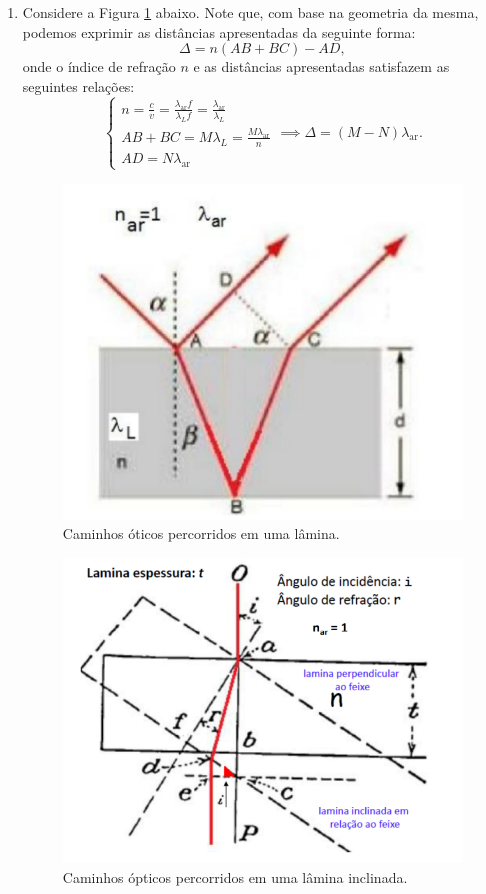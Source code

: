 \documentclass[12pt,a4paper]{article}
\begin{document}
\begin{enumerate}[label = \alph*)]
    \item Considere a Figura \ref{fig:optic} abaixo. Note que, com base na geometria da mesma, podemos exprimir as distâncias apresentadas da seguinte forma:
    \begin{equation}\label{eq:Atv8h-1}
        \Delta=n\left(AB+BC\right)-AD,
    \end{equation}
    onde o índice de refração $n$ e as distâncias apresentadas satisfazem as seguintes relações:
    \begin{equation}\label{eq:Atv8h-2}
        \begin{cases}
            n=\frac{c}{v}=\frac{\lambda_{\text{ar}}f}{\lambda_{L} f}=\frac{\lambda_{\text{ar}}}{\lambda_L} \\
            AB+BC=M\lambda_L=\frac{M\lambda_{\text{ar}}}{n} \\
            AD=N\lambda_{\text{ar}}
        \end{cases}\implies
        \Delta=\left(M-N\right)\lambda_{\text{ar}}.
    \end{equation}
    
    \begin{figure}[htp!]
        \centering
        \includegraphics[width=0.5\linewidth]{Figures/optic.png}
        \caption{Caminhos óticos percorridos em uma lâmina.}
        \label{fig:optic}
    \end{figure}

    \begin{figure}[htp!]
        \centering
        \includegraphics[width=0.5\linewidth]{Figures/optic-.png}
        \caption{Caminhos ópticos percorridos em uma lâmina inclinada.}
        \label{fig:optic-}
    \end{figure}


\end{enumerate}
\end{document}

